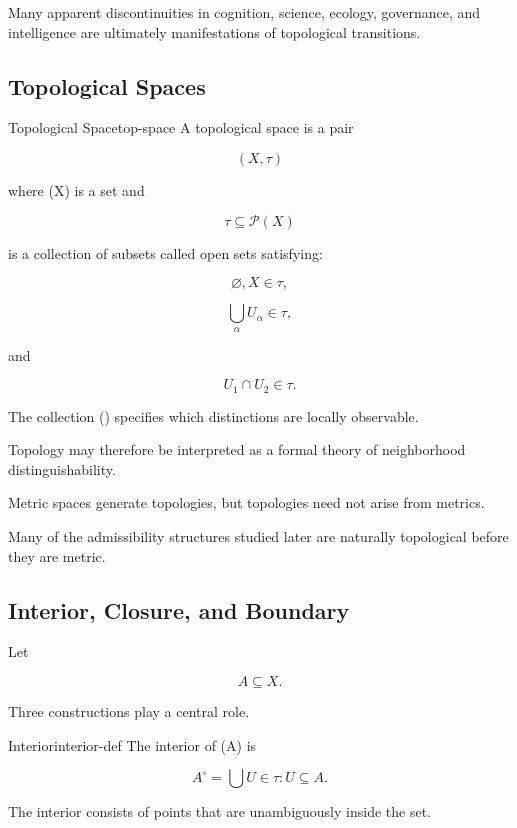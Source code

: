 \documentclass[12pt,twoside,openright]{book}
\newenvironment{rem}
{\begin{remark}{}{}}
{\end{remark}}
\begin{document}
Many apparent discontinuities in cognition, science,
ecology, governance, and intelligence are ultimately
manifestations of topological transitions.

\subsection{Topological Spaces}

\begin{definition}{Topological Space}{top-space}
A topological space is a pair

\[
(X,\tau)
\]

where (X) is a set and

\[
\tau
\subseteq
\mathcal P(X)
\]

is a collection of subsets called open sets satisfying:

\[
\varnothing,X\in\tau,
\]

\[
\bigcup_{\alpha}U_\alpha\in\tau,
\]

and

\[
U_1\cap U_2\in\tau.
\]
\end{definition}

The collection (\tau) specifies which distinctions are
locally observable.

Topology may therefore be interpreted as a formal theory
of neighborhood distinguishability.

\begin{rem}
Metric spaces generate topologies, but topologies need not
arise from metrics.

Many of the admissibility structures studied later are
naturally topological before they are metric.
\end{rem}

\subsection{Interior, Closure, and Boundary}

Let

\[
A\subseteq X.
\]

Three constructions play a central role.

\begin{definition}{Interior}{interior-def}
The interior of (A) is

\[
A^\circ
=

\bigcup
{U\in\tau:U\subseteq A}.
\]
\end{definition}

The interior consists of points that are unambiguously
inside the set.
\end{document}
